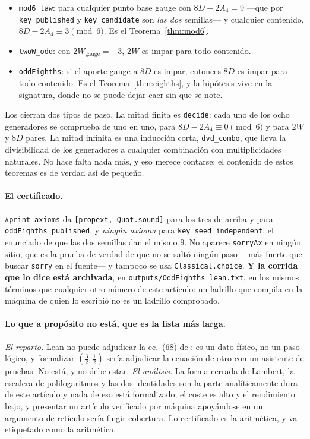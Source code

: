 \documentclass[11pt,a4paper]{article}
\begin{document}
\begin{itemize}\itemsep2pt
\item \texttt{mod6\_law}: para cualquier punto base gauge con $8D-2A_4=9$ ---que por
  \texttt{key\_published} y \texttt{key\_candidate} son \emph{las dos} semillas--- y cualquier
  contenido, $8D-2A_4\equiv3\pmod6$. Es el Teorema~\ref{thm:mod6}.
\item \texttt{twoW\_odd}: con $2W_{\text{gauge}}=-3$, $2W$ es impar para todo contenido.
\item \texttt{oddEighths}: si el aporte gauge a $8D$ es impar, entonces $8D$ es impar para todo
  contenido. Es el Teorema~\ref{thm:eighths}, y la hipótesis vive en la signatura, donde no se
  puede dejar caer sin que se note.
\end{itemize}

\noindent Los cierran dos tipos de paso. La mitad finita es \texttt{decide}: cada uno de los ocho
generadores se comprueba de uno en uno, para $8D-2A_4\equiv0\pmod6$ y para $2W$ y $8D$ pares. La
mitad infinita es una inducción corta, \texttt{dvd\_combo}, que lleva la divisibilidad de los
generadores a cualquier combinación con multiplicidades naturales. No hace falta nada más, y eso
merece contarse: el contenido de estos teoremas es de verdad así de pequeño.

\paragraph{El certificado.} \texttt{\#print axioms} da \texttt{[propext, Quot.sound]} para los tres
de arriba y para \texttt{oddEighths\_published}, y \emph{ningún axioma} para
\texttt{key\_seed\_independent}, el enunciado de que las dos semillas dan el mismo $9$. No aparece
\texttt{sorryAx} en ningún sitio, que es la prueba de verdad de que no se saltó ningún paso ---más
fuerte que buscar \texttt{sorry} en el fuente--- y tampoco se usa \texttt{Classical.choice}.
\textbf{Y la corrida que lo dice está archivada}, en
\texttt{outputs/\allowbreak OddEighths\_\allowbreak lean.txt}, en los mismos términos que
cualquier otro número de este artículo: un ladrillo que compila en la máquina de quien lo escribió
no es un ladrillo comprobado.

\paragraph{Lo que a propósito no está, que es la lista más larga.} \emph{El reparto.} Lean no puede
adjudicar la ec.~(68) de \cite{KM25}: es un dato físico, no un paso lógico, y formalizar
$(\tfrac32,\tfrac12)$ sería adjudicar la ecuación de otro con un asistente de pruebas. No está, y
no debe estar. \emph{El análisis.} La forma cerrada de Lambert, la escalera de polilogaritmos y las
dos identidades son la parte analíticamente dura de este artículo y nada de eso está formalizado;
el coste es alto y el rendimiento bajo, y presentar un artículo verificado por máquina apoyándose
en un argumento de retículo sería fingir cobertura. Lo certificado es la aritmética, y va
etiquetado como la aritmética.
\end{document}
